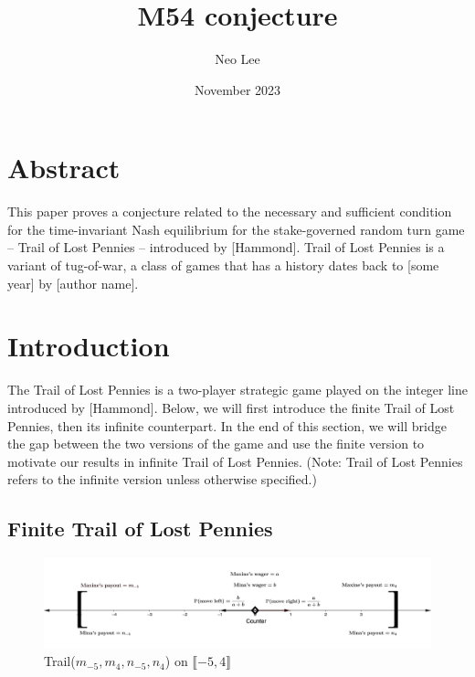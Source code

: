 \documentclass{article}
\title{M54 conjecture}
\author{Neo Lee}
\date{November 2023}
\begin{document}
\maketitle

\section{\centering Abstract}
This paper proves a conjecture related to the necessary and sufficient condition for the
time-invariant Nash equilibrium for the stake-governed random turn game -- Trail of Lost Pennies --
introduced by [Hammond]. Trail of Lost Pennies is a variant of tug-of-war, a class of games that has
a history dates back to [some year] by [author name]. 

\section{\centering Introduction}
The Trail of Lost Pennies is a two-player strategic game played on the integer line introduced by
[Hammond]. Below, we will first introduce the finite Trail of Lost Pennies, then its infinite
counterpart. In the end of this section, we will bridge the gap between the two versions of the game
and use the finite version to motivate our results in infinite Trail of Lost Pennies. (Note: Trail
of Lost Pennies refers to the infinite version unless otherwise specified.)

\subsection{\centering Finite Trail of Lost Pennies}
\begin{figure}[htb!]
    \centering
    \includegraphics[scale=0.3]{finite_trail.png}
    \caption{Trail($m_{-5}, m_{4}, n_{-5}, n_{4}$) on $\llbracket-5, 4\rrbracket$}
\end{figure}
\end{document}

